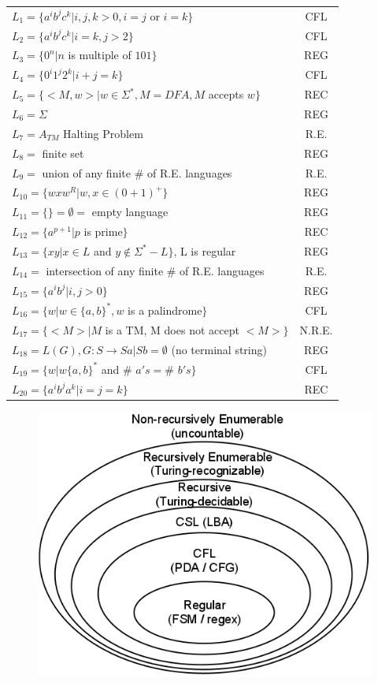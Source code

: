 \documentclass[8pt,letterpaper,twocolumn]{article}
\begin{document}
\begin{tabular}{l | c}
$L_1 = \{a^i b^j c^k | i,j,k > 0, i=j$ or $i=k\}$ & CFL \\
$L_2 = \{a^i b^j c^k | i = k, j > 2\}$ & CFL \\
$L_3 = \{0^n | n$ is multiple of $101\}$ & REG \\
$L_4 = \{0^i 1^j 2^k | i + j = k\}$ & CFL \\
$L_5 = \{<M,w> | w \in \Sigma^*, M = DFA, M$ accepts $w\}$ & REC \\
$L_6 = \Sigma$ & REG \\
$L_7 = A_{TM}$ Halting Problem & R.E. \\
$L_8 =$ finite set & REG \\
$L_9 =$ union of any finite \# of R.E. languages & R.E. \\
$L_{10} = \{wxw^R | w,x \in (0+1)^+\}$ & REG \\
$L_{11} = \{\} = \emptyset = $ empty language & REG \\
$L_{12} = \{a^{p+1} | p$ is prime$\}$ & REC \\
$L_{13} = \{xy | x \in L$ and $y \notin \Sigma^* - L\}$, L is regular & REG \\
$L_{14} =$ intersection of any finite \# of R.E. languages & R.E. \\
$L_{15} = \{a^i b^j | i,j > 0\}$ & REG \\
$L_{16} = \{w | w \in \{a,b\}^*, w$ is a palindrome$ \}$ & CFL \\
$L_{17} = \{<M> | M$ is a TM, M does not accept $<M>\}$ & N.R.E. \\
$L_{18} = L(G), G: S \rightarrow Sa | Sb = \emptyset$ (no terminal string)  & REG \\
$L_{19} = \{w | w \{a,b\}^*$ and \# $ a's = $\# $ b's \}$ & CFL \\
$L_{20} = \{a^i b^j a^k | i = j = k\}$ & REC \\
\end{tabular}
\begin{figure}[h!]
  \centering
    \includegraphics[scale=0.5]{ChomskyHierarchy.png}
  \label{CH}
\end{figure}
\end{document}
